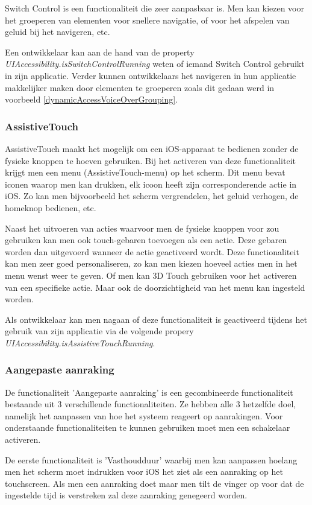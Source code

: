 Switch Control is een functionaliteit die zeer aanpasbaar is. Men kan kiezen voor het groeperen van elementen voor snellere navigatie, of voor het afspelen van geluid bij het navigeren, etc.

Een ontwikkelaar kan aan de hand van de property \emph{UIAccessibility.isSwitchControlRunning} weten of iemand Switch Control gebruikt in zijn applicatie. Verder kunnen ontwikkelaars het navigeren in hun applicatie makkelijker maken door elementen te groeperen zoals dit gedaan werd in voorbeeld \ref{dynamicAccessVoiceOverGrouping}.
\subsubsection{AssistiveTouch}
AssistiveTouch maakt het mogelijk om een iOS-apparaat te bedienen zonder de fysieke knoppen te hoeven gebruiken. Bij het activeren van deze functionaliteit krijgt men een menu (AssistiveTouch-menu) op het scherm. Dit menu bevat iconen waarop men kan drukken, elk icoon heeft zijn corresponderende actie in iOS. Zo kan men bijvoorbeeld het scherm vergrendelen, het geluid verhogen, de homeknop bedienen, etc.

Naast het uitvoeren van acties waarvoor men de fysieke knoppen voor zou gebruiken kan men ook touch-gebaren toevoegen als een actie.  Deze gebaren worden dan uitgevoerd wanneer de actie geactiveerd wordt. Deze functionaliteit kan men zeer goed personaliseren, zo kan men kiezen hoeveel acties men in het menu wenst weer te geven. Of men kan 3D Touch gebruiken voor het activeren van een specifieke actie.  Maar ook de doorzichtigheid van het menu kan ingesteld worden.

Als ontwikkelaar kan men nagaan of deze functionaliteit is geactiveerd tijdens het gebruik van zijn applicatie via de volgende propery \emph{UIAccessibility.isAssistiveTouchRunning}.
\subsubsection{Aangepaste aanraking}
\label{subsec:iOSAangepast}
De functionaliteit 'Aangepaste aanraking' is een gecombineerde functionaliteit bestaande uit 3 verschillende functionaliteiten. Ze hebben alle 3 hetzelfde doel, namelijk het aanpassen van hoe het systeem reageert op aanrakingen. Voor onderstaande functionaliteiten te kunnen gebruiken moet men een schakelaar activeren.

De eerste functionaliteit is 'Vasthoudduur' waarbij men kan aanpassen hoelang men het scherm moet indrukken voor iOS het ziet als een aanraking op het touchscreen. Als men een aanraking doet maar men tilt de vinger op voor dat de ingestelde tijd is verstreken zal deze aanraking genegeerd worden. 


